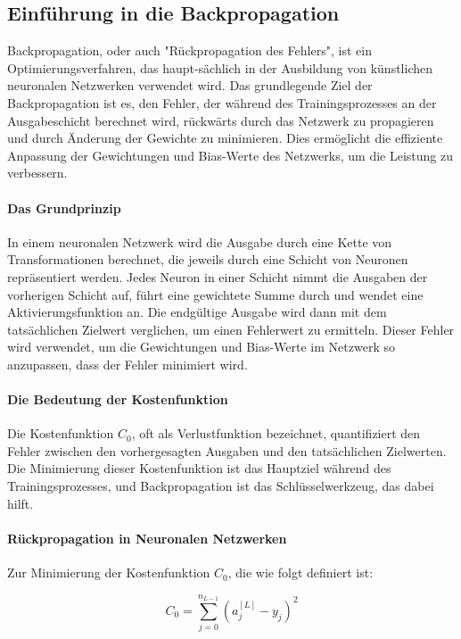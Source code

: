 
\subsection{Einführung in die Backpropagation}

Backpropagation, oder auch "Rückpropagation des Fehlers", ist ein Optimierungsverfahren, das haupt-sächlich in der Ausbildung von künstlichen neuronalen Netzwerken verwendet wird. Das grundlegende Ziel der Backpropagation ist es, den Fehler, der während des Trainingsprozesses an der Ausgabeschicht berechnet wird, rückwärts durch das Netzwerk zu propagieren und durch Änderung der Gewichte zu minimieren. Dies ermöglicht die effiziente Anpassung der Gewichtungen und Bias-Werte des Netzwerks, um die Leistung zu verbessern.

\paragraph{Das Grundprinzip}

In einem neuronalen Netzwerk wird die Ausgabe durch eine Kette von Transformationen berechnet, die jeweils durch eine Schicht von Neuronen repräsentiert werden. Jedes Neuron in einer Schicht nimmt die Ausgaben der vorherigen Schicht auf, führt eine gewichtete Summe durch und wendet eine Aktivierungsfunktion an. Die endgültige Ausgabe wird dann mit dem tatsächlichen Zielwert verglichen, um einen Fehlerwert zu ermitteln. Dieser Fehler wird verwendet, um die Gewichtungen und Bias-Werte im Netzwerk so anzupassen, dass der Fehler minimiert wird.

\paragraph{Die Bedeutung der Kostenfunktion}
Die Kostenfunktion \( C_0 \), oft als Verlustfunktion bezeichnet, quantifiziert den Fehler zwischen den vorhergesagten Ausgaben und den tatsächlichen Zielwerten. Die Minimierung dieser Kostenfunktion ist das Hauptziel während des Trainingsprozesses, und Backpropagation ist das Schlüsselwerkzeug, das dabei hilft.

\paragraph{Rückpropagation in Neuronalen Netzwerken}
Zur Minimierung der Kostenfunktion \( C_0 \), die wie folgt definiert ist:

\begin{equation}
C_0 = \sum_{j=0}^{n_{L-1}} (a_j^{[L]} - y_j)^2
\label{eq:cost_function}
\end{equation}

